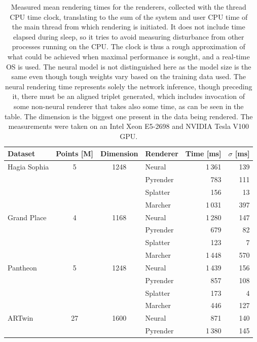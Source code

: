 \begin{table}
\caption[Mean rendering times]{Measured mean rendering times for the renderers,
collected with the thread CPU time clock, translating to the sum of
the system and user CPU time of the main thread from which rendering is
initiated. It does not include time elapsed during sleep, so it tries to avoid
measuring disturbance from other processes running on the CPU. The clock is
thus a rough approximation of what could be achieved when maximal
performance is sought, and a real-time OS is used. The neural model is not
distinguished here as the model size is the same even though tough weights vary
based on the training data used. The neural rendering time represents solely
the network inference, though preceding it, there must be an aligned triplet
generated, which includes invocation of some non-neural renderer that takes
also some time, as can be seen in the table. The dimension is the biggest
one present in the data being rendered. The measurements were taken on an
Intel Xeon E5-2698 and NVIDIA Tesla V100 GPU.}
\centering
    \begin{tabular}{l c c p{18mm} r r}
    \toprule
    Dataset & Points [M] & Dimension & Renderer & Time [ms] & $\sigma$ [ms] \\
    \midrule
    Hagia Sophia & 5  & 1248 & Neural   & 1\,361 & 139\\
                 &    &      & Pyrender &    783 & 111\\
                 &    &      & Splatter &    156 & 13  \\
                 &    &      & Marcher  & 1\,031 & 397\\[0.3cm]
    Grand Place  & 4  & 1168 & Neural   & 1\,280 & 147\\
                 &    &      & Pyrender &    679 & 82\\
                 &    &      & Splatter &    123 & 7\\
                 &    &      & Marcher  & 1\,448 & 570\\[0.3cm]
    Pantheon     & 5  & 1248 & Neural   & 1\,439 & 156\\
                 &    &      & Pyrender &    857 & 108\\
                 &    &      & Splatter &    173 & 4\\
                 &    &      & Marcher  &    446 & 127\\[0.3cm]
    ARTwin       & 27 & 1600 & Neural   &    871 & 140\\
                 &    &      & Pyrender & 1\,380 & 145\\

\end{tabular}
\end{table}
